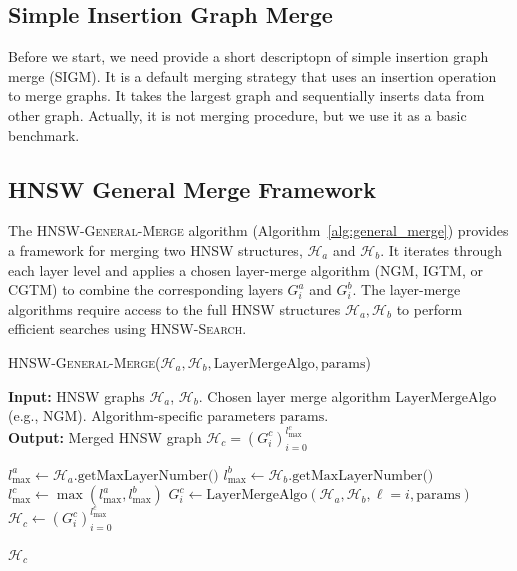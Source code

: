 \documentclass{article}
\begin{document}
\subsection{Simple Insertion Graph Merge}
Before we start, we need provide a short descriptopn of simple insertion graph merge (SIGM). It is a default merging strategy that uses an insertion operation to merge graphs. It takes the largest graph and sequentially inserts data from other graph. Actually, it is not merging procedure, but we use it as a basic benchmark.

\subsection{HNSW General Merge Framework}

The \textsc{HNSW-General-Merge} algorithm (Algorithm~\ref{alg:general_merge}) provides a framework for merging two HNSW structures, $\mathcal{H}_a$ and $\mathcal{H}_b$. It iterates through each layer level and applies a chosen layer-merge algorithm (\textsc{NGM}, \textsc{IGTM}, or \textsc{CGTM}) to combine the corresponding layers $G^a_i$ and $G^b_i$. The layer-merge algorithms require access to the full HNSW structures $\mathcal{H}_a, \mathcal{H}_b$ to perform efficient searches using \textsc{HNSW-Search}.


\begin{algorithm}
\caption{\textsc{HNSW-General-Merge}($\mathcal{H}_a, \mathcal{H}_b, \text{LayerMergeAlgo}, \text{params}$)}\label{alg:general_merge}
\textbf{Input:} HNSW graphs $\mathcal{H}_a$, $\mathcal{H}_b $. Chosen layer merge algorithm $\text{LayerMergeAlgo}$ (e.g., \textsc{NGM}). Algorithm-specific parameters $\text{params}$. \\
\textbf{Output:} Merged HNSW graph $\mathcal{H}_c = (G^c_i)_{i=0}^{l_{\max}^c}$
\begin{algorithmic}[1]
\State $l_{\max}^a \gets \mathcal{H}_a.\text{getMaxLayerNumber()}$
\State $l_{\max}^b \gets \mathcal{H}_b.\text{getMaxLayerNumber()}$
\State $l_{\max}^c \gets \max(l_{\max}^a, l_{\max}^b)$
     
    \State $G^c_i \gets \text{LayerMergeAlgo}(\mathcal{H}_a, \mathcal{H}_b, \ell=i, \text{params})$ 
\EndFor
\State $\mathcal{H}_c \gets (G^c_i)_{i=0}^{l_{\max}^c}$ %

\State \Return $\mathcal{H}_c$
\end{algorithmic}
\end{algorithm}
\end{document}
